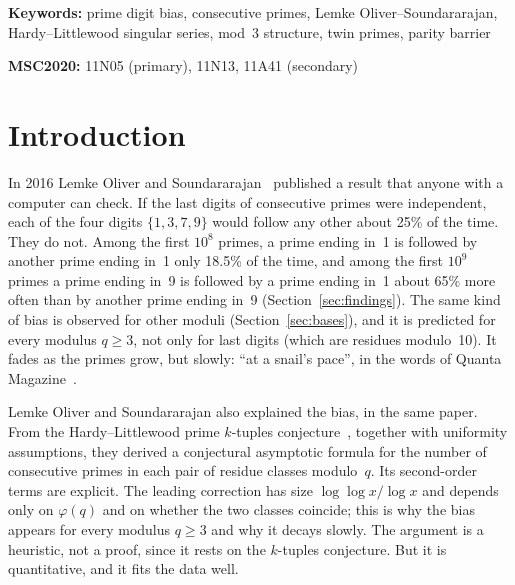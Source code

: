 \documentclass[12pt,a4paper]{article}
\theoremstyle{plain}
\theoremstyle{definition}
\theoremstyle{remark}
\begin{document}
\medskip
\noindent\textbf{Keywords:} prime digit bias, consecutive primes,
Lemke Oliver--Soundararajan, Hardy--Littlewood singular series, mod~3 structure,
twin primes, parity barrier

\noindent\textbf{MSC2020:} 11N05 (primary), 11N13, 11A41 (secondary)

\section{Introduction}
\label{sec:intro}

In 2016 Lemke Oliver and Soundararajan~\cite{LOS16} published a result that anyone
with a computer can check. If the last digits of consecutive primes were independent,
each of the four digits $\{1, 3, 7, 9\}$ would follow any other about 25\% of the time.
They do not. Among the first $10^8$ primes, a prime ending in~1 is followed by another
prime ending in~1 only 18.5\% of the time, and among the first $10^9$ primes a prime
ending in~9 is followed by a prime ending in~1 about 65\% more often than by another
prime ending in~9 (Section~\ref{sec:findings}). The same kind of bias is observed for
other moduli (Section~\ref{sec:bases}), and it is predicted for every modulus $q \geq 3$,
not only for last digits (which are residues modulo~10). It fades as the
primes grow, but slowly: ``at a snail's pace'', in the words of Quanta
Magazine~\cite{Kla16}.

Lemke Oliver and Soundararajan also explained the bias, in the same paper. From the
Hardy--Littlewood prime $k$-tuples conjecture~\cite{HL23}, together with uniformity
assumptions, they derived a conjectural asymptotic formula for the number of
consecutive primes in each pair of residue classes modulo~$q$. Its second-order terms
are explicit. The leading correction has size $\log\log x/\log x$ and depends only on
$\varphi(q)$ and on whether the two classes coincide; this is why the bias appears for
every modulus $q \geq 3$ and why it decays slowly. The argument is a heuristic, not a proof, since it
rests on the $k$-tuples conjecture. But it is quantitative, and it fits the data well.
\end{document}
